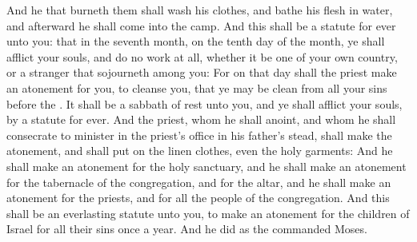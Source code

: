 \begin{biblechapter}
\verse And he that burneth them shall wash his clothes, and bathe his flesh in water, and afterward he shall come into the camp.
\verse And this shall be a statute for ever unto you: that in the seventh month, on the tenth day of the month, ye shall afflict your souls, and do no work at all, whether it be one of your own country, or a stranger that sojourneth among you:
\verse For on that day shall the priest make an atonement for you, to cleanse you, that ye may be clean from all your sins before the \LORD.
\verse It shall be a sabbath of rest unto you, and ye shall afflict your souls, by a statute for ever.
\verse And the priest, whom he shall anoint, and whom he shall consecrate to minister in the priest's office in his father's stead, shall make the atonement, and shall put on the linen clothes, even the holy garments:
\verse And he shall make an atonement for the holy sanctuary, and he shall make an atonement for the tabernacle of the congregation, and for the altar, and he shall make an atonement for the priests, and for all the people of the congregation.
\verse And this shall be an everlasting statute unto you, to make an atonement for the children of Israel for all their sins once a year. And he did as the \LORD commanded Moses.
\end{biblechapter}

\flushcolsend %

